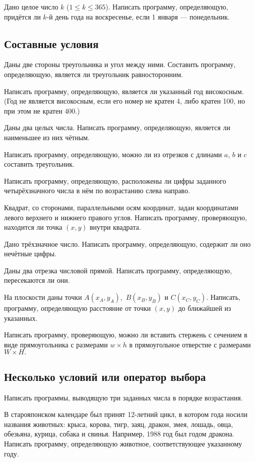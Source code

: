 \task Дано целое число $k$ ($1 \leqslant k \leqslant 365$). Написать
программу, определяющую, придётся ли $k$-й день года на воскресенье,
если 1 января — понедельник.

\subsection{Составные условия} 

\task Даны две стороны треугольника и угол между ними. Составить
программу, определяющую, является ли треугольник равносторонним.

\task Написать программу, определяющую, является ли указанный год
високосным. (Год не является високосным, если его номер не кратен 4,
либо кратен 100, но при этом не кратен 400.)

\task Даны два целых числа. Написать программу, определяющую, является
ли наименьшее из них чётным.

\task Написать программу, определяющую, можно ли из отрезков с длинами
$a$, $b$ и $c$ составить треугольник.

\task Написать программу, определяющую, расположены ли цифры заданного
четырёхзначного числа в нём по возрастанию слева направо.

\task Квадрат, со сторонами, параллельными осям координат, задан
координатами левого верхнего и нижнего правого углов. Написать
программу, проверяющую, находится ли точка $(x, y)$ внутри квадрата.

\task Дано трёхзначное число. Написать программу, определяющую,
содержит ли оно нечётные цифры.

\task Даны два отрезка числовой прямой. Написать программу,
определяющую, пересекаются ли они.

\task На плоскости даны точки $A(x_A, y_A),$ $B(x_B, y_B)$ и $C(x_C,
y_C)$. Написать, программу, определяющую расстояние от точки $(x, y)$
до ближайшей из указанных.

\task Написать программу, проверяющую, можно ли вставить стержень с
сечением в виде прямоугольника с размерами $w\times h$ в прямоугольное
отверстие с размерами $W\times H.$

\subsection{Несколько условий или оператор выбора}

\task Написать программы, выводящую три заданных числа в порядке
возрастания.

\task В старояпонском календаре был принят 12-летний цикл, в котором
года носили названия животных: крыса, корова, тигр, заяц, дракон,
змея, лошадь, овца, обезьяна, курица, собака и свинья. Например, 1988
год был годом дракона. Написать программу, определяющую животное,
соответствующее указанному году.

